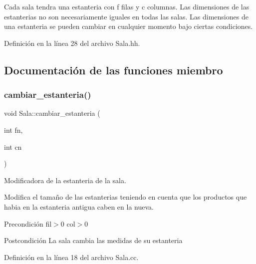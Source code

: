 Cada sala tendra una estanteria con f filas y c columnas. Las dimensiones de las estanterias no son necesariamente iguales en todas las salas. Las dimensiones de una estanteria se pueden cambiar en cualquier momento bajo ciertas condiciones. 

Definición en la línea 28 del archivo Sala.\+hh.



\subsection{Documentación de las funciones miembro}
\mbox{\label{class_sala_a063378a8c289f9d37c7ba26448aa55f2}} 
\subsubsection{\texorpdfstring{cambiar\+\_\+estanteria()}{cambiar\_estanteria()}}
{\footnotesize\ttfamily void Sala\+::cambiar\+\_\+estanteria (\begin{DoxyParamCaption}\item[{int}]{fn,  }\item[{int}]{cn }\end{DoxyParamCaption})}



Modificadora de la estanteria de la sala. 

Modifica el tamaño de las estanterias teniendo en cuenta que los productos que habia en la estanteria antigua caben en la nueva. \begin{DoxyPrecond}{Precondición}
fil$>$0 col$>$0 
\end{DoxyPrecond}
\begin{DoxyPostcond}{Postcondición}
La sala cambia las medidas de su estanteria 
\end{DoxyPostcond}


Definición en la línea 18 del archivo Sala.\+cc.


